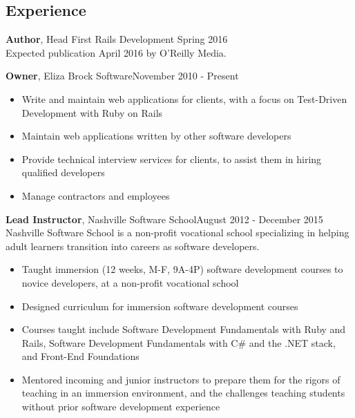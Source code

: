 \documentclass[line, margin, 10pt]{res}
\begin{document}
\renewcommand{\namefont}{ \LARGE \bf }

\address{eliza@elizabrocksoftware.com}
\address{elizabrock.com}

\begin{resume}
\section{Experience}


{\bf Author}, Head First Rails Development \hfill Spring 2016\\
Expected publication April 2016 by O'Reilly Media.

{\bf Owner}, Eliza Brock Software\hfill November 2010 - Present
\begin{itemize} \itemsep -2pt  %
  \item Write and maintain web applications for clients, with a focus on Test-Driven Development with Ruby on Rails
  \item Maintain web applications written by other software developers
  \item Provide technical interview services for clients, to assist them in hiring qualified developers
  \item Manage contractors and employees
\end{itemize}

{\bf Lead Instructor}, Nashville Software School\hfill August 2012 - December 2015\\
Nashville Software School is a non-profit vocational school specializing in helping adult learners transition into careers as software developers.
\begin{itemize} \itemsep -2pt  %
  \item Taught immersion (12 weeks, M-F, 9A-4P) software development courses to novice developers, at a non-profit vocational school
  \item Designed curriculum for immersion software development courses
  \item Courses taught include Software Development Fundamentals with Ruby and Rails, Software Development Fundamentals with C\# and the .NET stack, and Front-End Foundations
  \item Mentored incoming and junior instructors to prepare them for the rigors of teaching in an immersion environment, and the challenges teaching students without prior software development experience
\end{itemize}


\end{resume}
\end{document}
